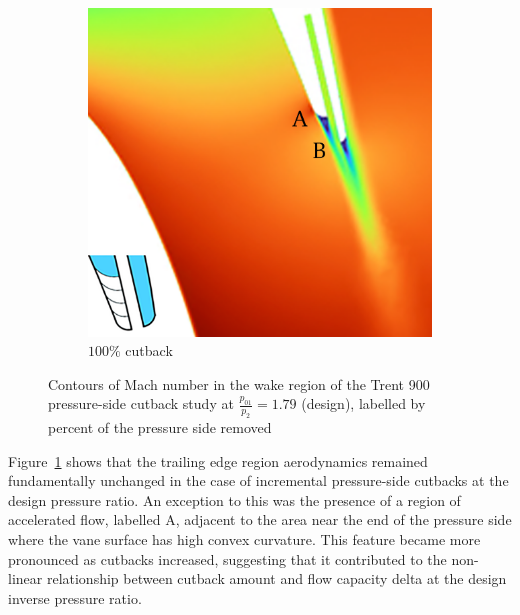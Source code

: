 \documentclass[a4paper, 11pt, oneside]{report}
\begin{document}
\begin{figure}[H]
\begin{subfigure}{.15\textwidth}
	\end{subfigure}
	\begin{subfigure}{.42\textwidth}
		\centering
		\includegraphics[width=\linewidth]{figs/ps_cutbacks_design_100_ver02.png}
		\caption{$100\%$ cutback}
	\end{subfigure}
	\caption{Contours of Mach number in the wake region of the Trent 900 pressure-side cutback study at $\frac{p_{01}}{p_2}=1.79$ (design), labelled by percent of the pressure side removed}
	\label{fig:ps_cutbacks_design}
\end{figure}

Figure~\ref{fig:ps_cutbacks_design} shows that the trailing edge region aerodynamics remained fundamentally unchanged in the case of incremental pressure-side cutbacks at the design pressure ratio. An exception to this was the presence of a region of accelerated flow, labelled A, adjacent to the area near the end of the pressure side where the vane surface has high convex curvature. This feature became more pronounced as cutbacks increased, suggesting that it contributed to the non-linear relationship between cutback amount and flow capacity delta at the design inverse pressure ratio. 
\end{document}
